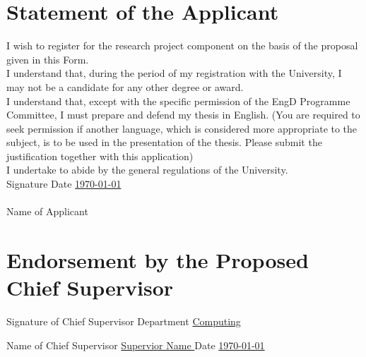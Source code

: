 \documentclass[
  11pt,
  a4paper,
  oneside
]{article}
\begin{document}
\section{Statement of the Applicant}


I wish to register for the research project component on the basis of the proposal given in this Form.\\


I understand that, during the period of my registration with the University, I may not be a candidate for any other degree or award.\\


I understand that, except with the specific permission of the EngD Programme Committee, I must prepare and defend my thesis in English.  (You are required to seek permission if another language, which is considered more appropriate to the subject, is to be used in the presentation of the thesis.  Please submit the justification together with this application)\\


I undertake to abide by the general regulations of the University.\\


Signature \uline{\hfill} Date \uline{\phantom{xxxxxxxx}\today\phantom{xxxxxxxxx}}\\
\phantom{xxxxxxxxxxxxxxxxxxxxxxxxxx}{\scriptsize (Applicant)}\\

Name of Applicant \uline{\phantom{xxxxxxxxxxxxxxxx}\theauthor\phantom{xxxxxxxxxxxxxxxx}}\\



\section{Endorsement by the Proposed Chief Supervisor}

\vspace{8ex}

Signature of Chief Supervisor \uline{\hfill}
Department \uline{\phantom{xxxxxxxx}Computing\phantom{xxxxxxxxxx}}\\

\vspace{3ex}

Name of Chief Supervisor \uline{\phantom{xxxxxxxxx} Supervior Name \hfill}
Date \uline{\phantom{xxxxxx} \today \phantom{xxxxxxxxxxx}}\\

\vspace{2ex}
\end{document}
